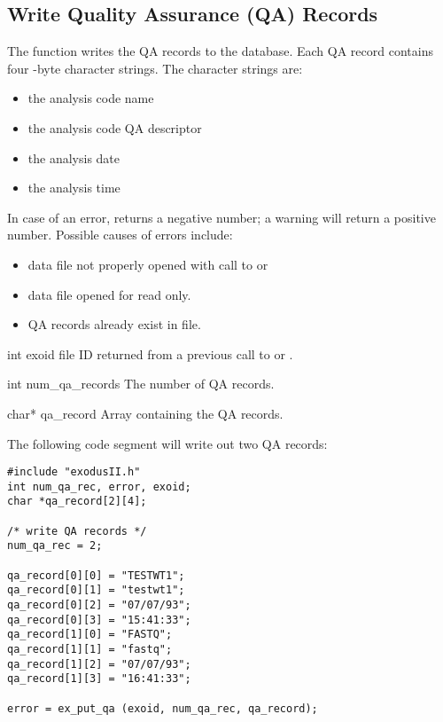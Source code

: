 \subsection{Write Quality Assurance (QA) Records}


The function  writes the QA records to the
database. Each QA record contains four -byte
character strings. The character strings are:

\begin{itemize}
\item the analysis code name
\item the analysis code QA descriptor
\item the analysis date
\item the analysis time
\end{itemize}

In case of an error,  returns a negative number; a
warning will return a positive number. Possible causes of errors
include:

\begin{itemize}
 \item data file not properly opened with call to  or

 \item data file opened for read only.

 \item QA records already exist in file.
\end{itemize}



\begin{parameters}
\item[{int exoid \R{}}]
\exo{} file ID returned from a previous call to  or
.

\item[{int num_qa_records \R{}}]
The number of QA records.

\item[{char* qa_record \R{}}]
Array containing the QA records.
\end{parameters}

The following code segment will write out two QA records:

\begin{lstlisting}
#include "exodusII.h"
int num_qa_rec, error, exoid;
char *qa_record[2][4];

/* write QA records */
num_qa_rec = 2;

qa_record[0][0] = "TESTWT1";
qa_record[0][1] = "testwt1";
qa_record[0][2] = "07/07/93";
qa_record[0][3] = "15:41:33";
qa_record[1][0] = "FASTQ";
qa_record[1][1] = "fastq";
qa_record[1][2] = "07/07/93";
qa_record[1][3] = "16:41:33";

error = ex_put_qa (exoid, num_qa_rec, qa_record);
\end{lstlisting}




